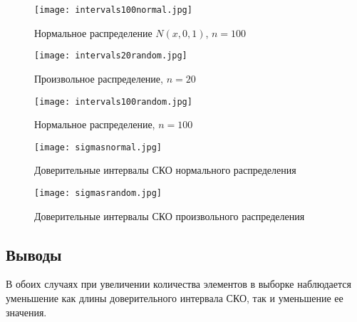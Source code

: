 \documentclass[14pt]{extarticle}
\begin{document}
\begin{figure}[H]
    \centering
    \texttt{[image: intervals100normal.jpg]}
    \caption{Нормальное распределение \(N(x, 0, 1)\), \(n=100\)}
    \label{fig:enter-label}
\end{figure}

\begin{figure}[H]
    \centering
    \texttt{[image: intervals20random.jpg]}
    \caption{Произвольное распределение, \(n=20\)}
    \label{fig:enter-label}
\end{figure}

\begin{figure}[H]
    \centering
    \texttt{[image: intervals100random.jpg]}
    \caption{Нормальное распределение, \(n=100\)}
    \label{fig:enter-label}
\end{figure}

\begin{figure}[H]
    \centering
    \texttt{[image: sigmasnormal.jpg]}
    \caption{Доверительные интервалы СКО нормального распределения}
    \label{fig:enter-normal}
    \vspace{1cm}
    \texttt{[image: sigmasrandom.jpg]}
    \caption{Доверительные интервалы СКО произвольного распределения}
    \label{fig:random}
\end{figure}

\subsection{Выводы}
В обоих случаях при увеличении количества элементов в выборке наблюдается уменьшение как длины доверительного интервала СКО, так и уменьшение ее значения.
\end{document}
